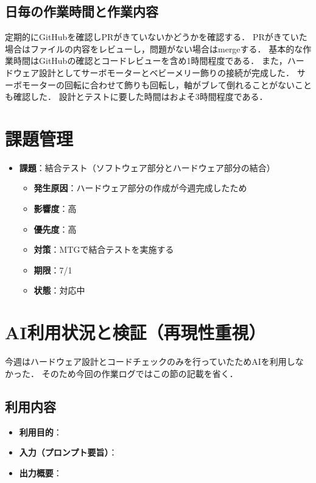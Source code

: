 \documentclass[a4paper,12pt]{ltjsarticle}
\begin{document}
\subsection{日毎の作業時間と作業内容}
定期的にGitHubを確認しPRがきていないかどうかを確認する．
PRがきていた場合はファイルの内容をレビューし，問題がない場合はmergeする．
基本的な作業時間はGitHubの確認とコードレビューを含め1時間程度である．
また，ハードウェア設計としてサーボモーターとベビーメリー飾りの接続が完成した．
サーボモーターの回転に合わせて飾りも回転し，軸がブレて倒れることがないことも確認した．
設計とテストに要した時間はおよそ3時間程度である．

\section{課題管理}
\begin{itemize}
  \item \textbf{課題}：結合テスト（ソフトウェア部分とハードウェア部分の結合）
    \begin{itemize}
      \item \textbf{発生原因}：ハードウェア部分の作成が今週完成したため
      \item \textbf{影響度}：高
      \item \textbf{優先度}：高
      \item \textbf{対策}：MTGで結合テストを実施する
      \item \textbf{期限}：7/1
      \item \textbf{状態}：対応中
    \end{itemize}
\end{itemize}


\section{AI利用状況と検証（再現性重視）}
今週はハードウェア設計とコードチェックのみを行っていたためAIを利用しなかった．
そのため今回の作業ログではこの節の記載を省く．

\subsection{利用内容}
\begin{itemize}
  \item \textbf{利用目的}：
  \item \textbf{入力（プロンプト要旨）}：
  \item \textbf{出力概要}：
\end{itemize}
\end{document}
